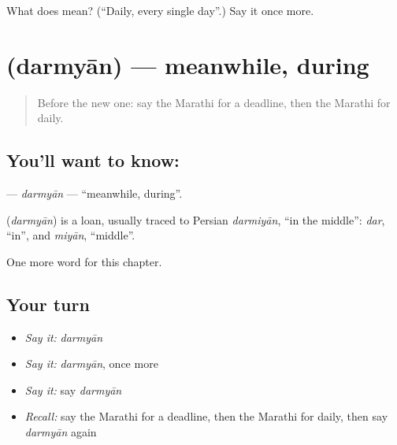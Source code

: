 \begin{tcolorbox}[breakable,colback=teal!4,colframe=teal!35!black,title={Before you move on}]
What does  mean? (\textquotedblleft{}Daily, every single day\textquotedblright{}.) Say it once more.
\end{tcolorbox}
\section[\texorpdfstring{\mr{दरम्यान} (darmyān)}{दरम्यान (darmyān)}]{ (darmyān) — meanwhile, during}

\label{lesson:MR-C230-darmyan}



\begin{quote}
Before the new one: say the Marathi for a deadline, then the Marathi for daily.
\end{quote}

\subsection*{You'll want to know: }
\textbf{} — \emph{darmyān} — \textquotedblleft{}meanwhile, during\textquotedblright{}.

\begin{cousinweb}
\textbf{} (\emph{darmyān}) is a loan, usually traced to Persian \emph{darmiyān}, \textquotedblleft{}in the middle\textquotedblright{}: \emph{dar}, \textquotedblleft{}in\textquotedblright{}, and \emph{miyān}, \textquotedblleft{}middle\textquotedblright{}.
\end{cousinweb}

\begin{grammarlens}[title={What you've built}]
One more word for this chapter.
\end{grammarlens}

\subsection*{Your turn}
\begin{itemize}
\raggedright
  \item \emph{Say it:} \emph{darmyān}
  \item \emph{Say it:} \emph{darmyān}, once more
  \item \emph{Say it:} say \emph{darmyān}
  \item \emph{Recall:} say the Marathi for a deadline, then the Marathi for daily, then say \emph{darmyān} again
\end{itemize}

